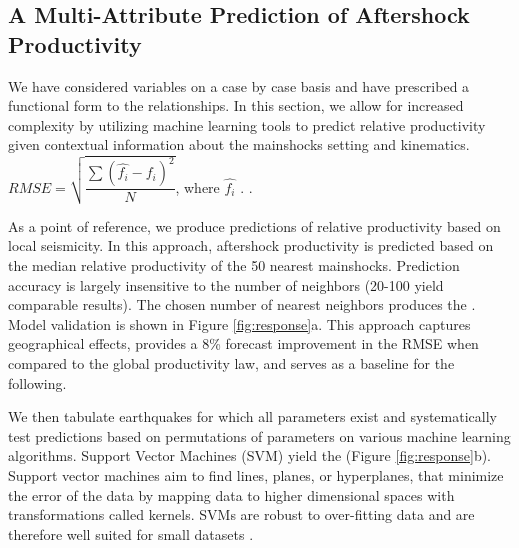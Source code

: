 \documentclass[draft, jgrga]{agujournal2018}
\begin{document}
    \subsection{A Multi-Attribute Prediction of Aftershock Productivity}

    We have considered variables on a case by case basis and have prescribed a functional form to the relationships. In this section, we allow for increased complexity by utilizing machine learning tools to predict relative productivity given contextual information about the mainshocks setting and kinematics.  $RMSE = \sqrt{\dfrac{\sum{(\hat{f_i}-f_i)^2}}{N}} $, where $\hat{f_i}$ .  \citep{witten2011}.

    As a point of reference, we produce predictions of relative productivity based on local seismicity. In this approach, aftershock productivity is predicted based on the median relative productivity of the 50 nearest mainshocks. Prediction accuracy is largely insensitive to the number of neighbors (20-100 yield comparable results). The chosen number of nearest neighbors produces the . Model validation is shown in Figure \ref{fig:response}a. This approach captures geographical effects, provides a 8\% forecast improvement in the RMSE when compared to the global productivity law, and serves as a baseline for the following.

    We then tabulate earthquakes for which all parameters exist and systematically test predictions based on permutations of parameters on various machine learning algorithms.  Support Vector Machines (SVM) yield the  (Figure \ref{fig:response}b). Support vector machines aim to find lines, planes, or hyperplanes, that minimize the error of the data by mapping data to higher dimensional spaces with transformations called kernels.  SVMs are robust to over-fitting data and are therefore well suited for small datasets \citep{witten2011}. 
\end{document}
